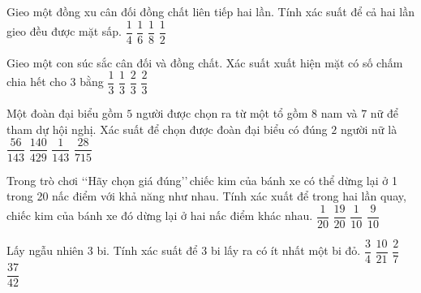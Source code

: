 \begin{ex}%
	Gieo một đồng xu cân đối đồng chất liên tiếp hai lần. Tính xác suất để cả hai lần gieo đều được mặt sấp.
	\choice
	{\True $\dfrac{1}{4}$}
	{$\dfrac{1}{6}$}
	{$\dfrac{1}{8}$}
	{$\dfrac{1}{2}$}
\end{ex}
\begin{ex}%
	Gieo một con súc sắc cân đối và đồng chất. Xác suất xuất hiện mặt có số chấm chia hết cho 3 bằng
	\choice
	{$\dfrac{1}{3}$}
	{\True $\dfrac{1}{3}$}
	{$\dfrac{2}{3}$}
	{$\dfrac{2}{3}$}
\end{ex}
\begin{ex}%
	Một đoàn đại biểu gồm $5$ người được chọn ra từ một tổ gồm $8$ nam và $7$ nữ để tham dự hội nghị. Xác suất để chọn được đoàn đại biểu có đúng $2$ người nữ là
	\choice
	{\True $\dfrac{56}{143}$}
	{$\dfrac{140}{429}$}
	{$\dfrac{1}{143}$}
	{$\dfrac{28}{715}$}
\end{ex}
\begin{ex}%
	Trong trò chơi \lq\lq Hãy chọn giá đúng\rq\rq\,chiếc kim của bánh xe có thể dừng lại ở 1 trong 20 nấc điểm với khả năng như nhau. Tính xác xuất để trong hai lần quay, chiếc kim của bánh xe đó dừng lại ở hai nấc điểm khác nhau.
	\choice
	{$\dfrac{1}{20}$}
	{\True $\dfrac{19}{20}$}
	{$\dfrac{1}{10}$}
	{$\dfrac{9}{10}$}
\end{ex}
\begin{ex}%
	Lấy ngẫu nhiên 3 bi. Tính xác suất để 3 bi lấy ra có ít nhất một bi đỏ.
	\choice
	{$\dfrac{3}{4}$}
	{$\dfrac{10}{21}$}
	{$\dfrac{2}{7}$}
	{\True $\dfrac{37}{42}$}				
\end{ex}				
